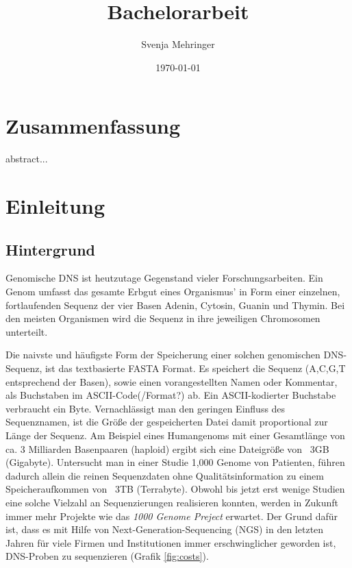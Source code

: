 \documentclass[12pt]{article}
\title{Bachelorarbeit}
\author{Svenja Mehringer}
\date{\today{}}
\begin{document}
\maketitle
\pagebreak
\tableofcontents
\pagebreak
\section{Zusammenfassung}
abstract...
\pagebreak
\section{Einleitung}
\subsection{Hintergrund}

Genomische DNS ist heutzutage Gegenstand vieler Forschungsarbeiten. Ein Genom umfasst das gesamte Erbgut eines Organismus' in Form einer einzelnen, fortlaufenden Sequenz der vier Basen Adenin, Cytosin, Guanin und Thymin. Bei den meisten Organismen wird die Sequenz in ihre jeweiligen Chromosomen unterteilt.

Die naivste und häufigste Form der Speicherung einer solchen genomischen DNS-Sequenz, ist das textbasierte FASTA Format. Es speichert die Sequenz (A,C,G,T entsprechend der Basen), sowie einen vorangestellten Namen oder Kommentar, als Buchstaben im ASCII-Code(/Format?) ab. Ein ASCII-kodierter Buchstabe verbraucht ein Byte. Vernachlässigt man den geringen Einfluss des Sequenznamen, ist die Größe der gespeicherten Datei damit proportional zur Länge der Sequenz. Am Beispiel eines Humangenoms mit einer Gesamtlänge von ca. 3 Milliarden Basenpaaren (haploid) ergibt sich eine Dateigröße von ~3GB (Gigabyte). Untersucht man in einer Studie 1,000 Genome von Patienten, führen dadurch allein die reinen Sequenzdaten ohne Qualitätsinformation zu einem Speicheraufkommen von ~3TB (Terrabyte). Obwohl bis jetzt erst wenige Studien eine solche Vielzahl an Sequenzierungen realisieren konnten, werden in Zukunft immer mehr Projekte wie das \textit{1000 Genome Preject}\cite{1000genomes} erwartet. Der Grund dafür ist, dass es mit Hilfe von Next-Generation-Sequencing (NGS) in den letzten Jahren für viele Firmen und Institutionen immer erschwinglicher geworden ist, DNS-Proben zu sequenzieren (Grafik \ref{fig:costs}).
\end{document}
